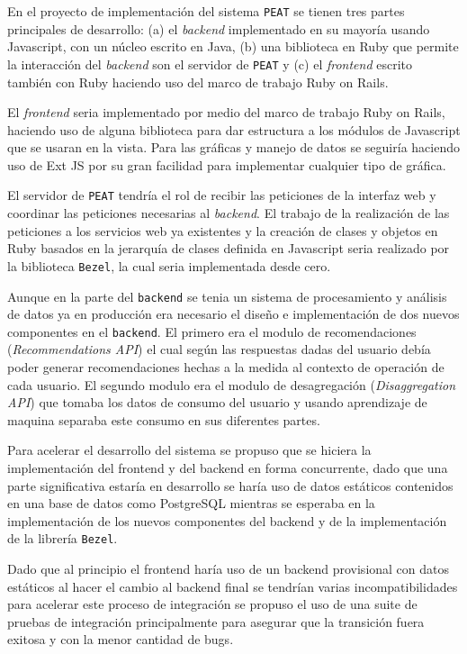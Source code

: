 En el proyecto de implementación del sistema \texttt{PEAT}
se tienen tres partes principales de desarrollo:
(a) el \textit{backend}  implementado en su mayoría usando
Javascript, con un núcleo escrito en Java, (b) una biblioteca en Ruby que permite
la interacción del \textit{backend} son el servidor de \texttt{PEAT} y
(c) el \textit{frontend} escrito también con Ruby haciendo uso del
marco de trabajo Ruby on Rails.

El \textit{frontend} seria implementado por medio del marco de trabajo Ruby on Rails,
haciendo uso de alguna biblioteca para dar estructura a los módulos de Javascript
que se usaran en la vista. Para las gráficas y manejo de datos se seguiría
haciendo uso de Ext JS por su gran facilidad para implementar cualquier tipo
de gráfica.

El servidor de \texttt{PEAT} tendría el rol de recibir las peticiones de la
interfaz web y coordinar las peticiones necesarias al \textit{backend}. El trabajo de
la realización de las peticiones a los servicios web ya existentes y la creación
de clases y objetos en Ruby basados en la jerarquía de clases definida en Javascript
seria realizado por la biblioteca \texttt{Bezel}, la cual seria implementada
desde cero.

Aunque en la parte del \texttt{backend} se tenia un sistema de procesamiento
y análisis de datos ya en producción era necesario el diseño e implementación
de dos nuevos componentes en el \texttt{backend}. El primero era el modulo de
recomendaciones (\textit{Recommendations API}) el cual según las respuestas
dadas del usuario debía poder generar recomendaciones hechas a la medida al
contexto de operación de cada usuario. El segundo modulo era el modulo de
desagregación (\textit{Disaggregation API}) que tomaba los datos de consumo
del usuario y usando aprendizaje de maquina separaba este consumo en sus
diferentes partes.

Para acelerar el desarrollo del sistema se propuso que se hiciera la implementación
del frontend y del backend en forma concurrente, dado que una parte significativa
estaría en desarrollo se haría uso de datos estáticos contenidos en una base de
datos como PostgreSQL mientras se esperaba en la implementación de los nuevos
componentes del backend y de la implementación de la librería \texttt{Bezel}.

Dado que al principio el frontend haría uso de un backend provisional con datos
estáticos al hacer el cambio al backend final se tendrían varias incompatibilidades
para acelerar este proceso de integración se propuso el uso de una suite de
pruebas de integración principalmente para asegurar que la transición fuera exitosa
y con la menor cantidad de bugs.

